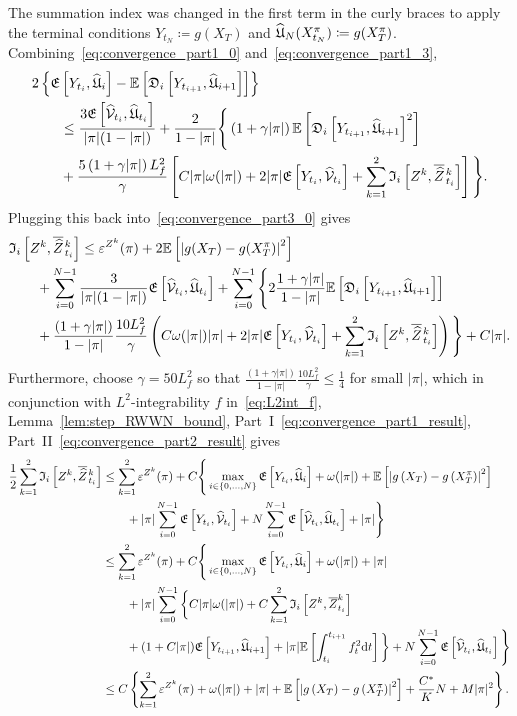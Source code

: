 The summation index was changed in the first term in the curly braces to apply the terminal conditions $Y_{t_N}\coloneqq g(X_T)$ and $\widehat{\mathfrak{U}}_N(X^\pi_{t_N})\coloneqq g(X^\pi_T)$.
Combining~\eqref{eq:convergence_part1_0} and~\eqref{eq:convergence_part1_3},
\begin{equation}
\begin{aligned}
& 2\left\{\mathfrak{E}\left[Y_{t_i}, \widehat{\mathfrak{U}}_{i}\right] - \mathbb{E}\left[\mathfrak{D}_i\left[Y_{t_{i+1}}, \widehat{\mathfrak{U}}_{i+1}\right]\right]\right\} \\
& \qquad\leq \frac{3 \mathfrak{E}\left[\widehat{\mathcal{V}}_{t_i}, \widehat{\mathfrak{U}}_{t_i}\right]}{|\pi|(1-|\pi|)} + \frac{2}{1-|\pi|}\Bigg\{\left(1+\gamma |\pi|\right) \mathbb{E}\left[\mathfrak{D}_i\left[Y_{t_{i+1}}, \widehat{\mathfrak{U}}_{i+1}\right]^{2}\right] \\ 
& \qquad + \frac{5\left(1+\gamma |\pi|\right) L_f^2}{\gamma}\left[C |\pi|\omega(|\pi|) +2|\pi| \mathfrak{E}\left[Y_{t_i}, \widehat{\mathcal{V}}_{t_i}\right] + \sum_{k=1}^{2}\mathfrak{I}_i\left[Z^k, \overline{\widehat{Z}}\kern0.1em^{k}_{t_i}\right]\right]\Bigg\}.
\end{aligned}
\end{equation}
Plugging this back into~\eqref{eq:convergence_part3_0} gives
\begin{equation}
\begin{aligned}
&\mathfrak{I}_i\left[Z^k, \overline{\widehat{Z}}\kern0.1em^{k}_{t_i}\right] \leq \varepsilon^{Z^k}(\pi) + 2\mathbb{E}\left[\left|g(X_T)-g(X^\pi_T)\right|^2\right] \\ 
& \qquad + \sum_{i=0}^{N-1} \frac{3}{|\pi|(1-|\pi|)} \mathfrak{E}\left[\widehat{\mathcal{V}}_{t_i}, \widehat{\mathfrak{U}}_{t_i}\right] +
\sum_{i=0}^{N-1}\Bigg\{2\frac{1+\gamma |\pi|}{1-|\pi|} \mathbb{E}\left[\mathfrak{D}_i\left[Y_{t_{i+1}}, \widehat{\mathfrak{U}}_{i+1}\right]\right] \\ 
& \qquad + \frac{\left(1+\gamma |\pi|\right)}{1-|\pi|} \frac{10 L_f^2}{\gamma}\left(C \omega(|\pi|)|\pi| +2|\pi| \mathfrak{E}\left[Y_{t_i}, \widehat{\mathcal{V}}_{t_i}\right] + \sum_{k=1}^{2}\mathfrak{I}_i\left[Z^k, \overline{\widehat{Z}}\kern0.1em^{k}_{t_i}\right]\right)\Bigg\} + C|\pi|.
\end{aligned}
\end{equation}
Furthermore, choose $\gamma=50L_f^2$ so that $\frac{\left(1+\gamma |\pi|\right)}{1-|\pi|} \frac{10 L_f^2}{\gamma}\leq\frac14$ for small $|\pi|$, which in conjunction with $L^2$-integrability $f$ in~\eqref{eq:L2int_f}, Lemma~\ref{lem:step_RWWN_bound}, Part~I~\eqref{eq:convergence_part1_result}, Part~II~\eqref{eq:convergence_part2_result} gives
\begin{equation}
\begin{aligned}
\frac{1}{2} \sum_{k=1}^2 \mathfrak{I}_i\left[Z^k, \overline{\widehat{Z}}\kern0.1em^{k}_{t_i}\right]
& \leq \sum_{k=1}^2\varepsilon^{Z^k}(\pi) + C \Bigg\{\max _{i\in\{0, \dots, N\}} \mathfrak{E}\left[Y_{t_i}, \widehat{\mathfrak{U}}_{i}\right] + \omega(|\pi|) + \mathbb{E}\left[\left|g\left(X_T\right)-g\left(X^\pi_T\right)\right|^2\right]\\
& \qquad + |\pi| \sum_{i=0}^{N-1} \mathfrak{E}\left[Y_{t_i}, \widehat{\mathcal{V}}_{t_i}\right]
+ N \sum_{i=0}^{N-1} \mathfrak{E}\left[\widehat{\mathcal{V}}_{t_i}, \widehat{\mathfrak{U}}_{t_i}\right] + |\pi| \Bigg\}
\\
&\leq \sum_{k=1}^2\varepsilon^{Z^k}(\pi) + C\Bigg\{\max _{i\in\{0, \dots, N\}} \mathfrak{E}\left[Y_{t_i}, \widehat{\mathfrak{U}}_{i}\right] + \omega(|\pi|) + |\pi| \\
& \qquad + |\pi| \sum_{i=0}^{N-1}\bigg\{C|\pi|\omega(|\pi|) + C \sum_{k=1}^2\mathfrak{I}_i\left[Z^k, \overline{Z}^{k}_{t_i}\right] \\
& \qquad + (1+C|\pi|) \mathfrak{E}\left[Y_{t_{i+1}}, \widehat{\mathfrak{U}}_{i+1}\right] + |\pi| \mathbb{E}\left[\int_{t_i}^{t_{i+1}}f_{t}^2 \mathrm{d} t\right]\bigg\}
 + N \sum_{i=0}^{N-1} \mathfrak{E}\left[\widehat{\mathcal{V}}_{t_i}, \widehat{\mathfrak{U}}_{t_i}\right] \Bigg\} \\
&\leq C\left\{\sum_{k=1}^2\varepsilon^{Z^k}(\pi) + \omega(|\pi|)+|\pi|+\mathbb{E}\left[\left|g\left(X_T\right)-g\left(X^\pi_T\right)\right|^2\right] + \frac{C^{*}}{K}N + M|\pi|^2\right\}.\label{eq:convergence_part3_1}
\end{aligned}
\end{equation}
